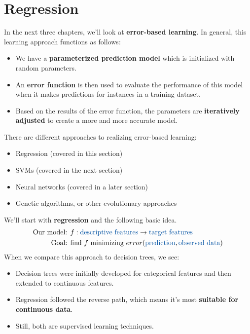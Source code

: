 \section{Regression}

In the next three chapters, we'll look at \textbf{error-based learning}. In general, this learning approach functions as follows:
\begin{itemize}
  \item We have a \textbf{parameterized prediction model} which is initialized with random parameters.
  \item An \textbf{error function} is then used to evaluate the performance of this model when it makes predictions for instances in a training dataset.
  \item Based on the results of the error function, the parameters are \textbf{iteratively adjusted} to create a more and more accurate model.
\end{itemize}

There are different approaches to realizing error-based learning:
\begin{itemize}
  \item Regression (covered in this section)
  \item SVMs (covered in the next section)
  \item Neural networks (covered in a later section)
  \item Genetic algorithms, or other evolutionary approaches
\end{itemize}

We'll start with \textbf{regression} and the following basic idea. 
\begin{align*}
  \text{Our model: } & f : \text{\color{mathblue}descriptive features} \rightarrow \text{\color{mathblue}target features}\\
  \text{Goal: } & \text{find } f \text{ minimizing } error(\text{\color{mathblue}prediction}, \text{\color{mathblue}observed data})
\end{align*}
When we compare this approach to decision trees, we see:
\begin{itemize}
  \item Decision trees were initially developed for categorical features and then extended to continuous features.
  \item Regression followed the reverse path, which means it's most \textbf{suitable for continuous data}.
  \item Still, both are supervised learning techniques.
\end{itemize}

